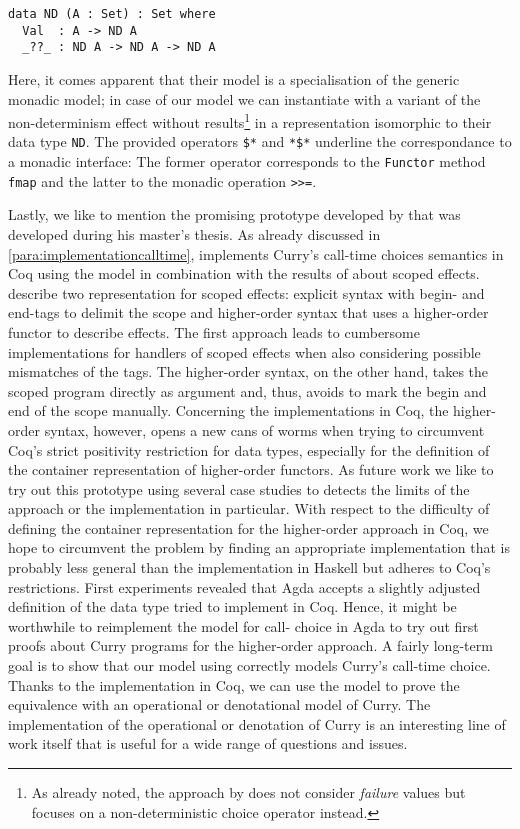 \begin{verbatim}
data ND (A : Set) : Set where
  Val  : A -> ND A
  _??_ : ND A -> ND A -> ND A
\end{verbatim}

Here, it comes apparent that their model is a specialisation of the generic monadic model; in case of our model we can instantiate  with a variant of the non-determinism effect  without  results\footnote{As already noted, the approach by \citeauthor{antoy2017proving} does not consider \emph{failure} values but focuses on a non-deterministic choice operator instead.} in a representation isomorphic to their data type \texttt{ND}.
The provided operators \texttt{\$*} and \texttt{*\$*} underline the correspondance to a monadic interface: The former operator corresponds to the \texttt{Functor} method \texttt{fmap} and the latter to the monadic operation \texttt{>>=}.

Lastly, we like to mention the promising prototype developed by \citet{bunkenburg2019modeling} that was developed during his master's thesis.
As already discussed in \autoref{para:implementationcalltime}, \citeauthor{bunkenburg2019modeling} implements Curry's call-time choices semantics in Coq using the  model in combination with the results of \citet{wu2014effect} about scoped effects.
\citeauthor{wu2014effect} describe two representation for scoped effects: explicit syntax with begin- and end-tags to delimit the scope and higher-order syntax that uses a higher-order functor to describe effects.
The first approach leads to cumbersome implementations for handlers of scoped effects when also considering possible mismatches of the tags.
The higher-order syntax, on the other hand, takes the scoped program directly as argument and, thus, avoids to mark the begin and end of the scope manually.
Concerning the implementations in Coq, the higher-order syntax, however, opens a new cans of worms when trying to circumvent Coq's strict positivity restriction for data types, especially for the definition of the container representation of higher-order functors.
As future work we like to try out this prototype using several case studies to detects the limits of the approach or the implementation in particular.
With respect to the difficulty of defining the container representation for the higher-order approach in Coq, we hope to circumvent the problem by finding an appropriate implementation that is probably less general than the implementation in Haskell but
adheres to Coq's restrictions.
First experiments revealed that Agda accepts a slightly adjusted definition of the data type \citeauthor{bunkenburg2019modeling} tried to implement in Coq.
Hence, it might be worthwhile to reimplement the model for call- choice in Agda to try out first proofs about Curry programs for the higher-order approach.
A fairly long-term goal is to show that our model using  correctly models Curry's call-time choice.
Thanks to the implementation in Coq, we can use the model to prove the equivalence with an operational or denotational model of Curry.
The implementation of the operational or denotation of Curry is an interesting line of work itself that is useful for a wide range of questions and issues.

